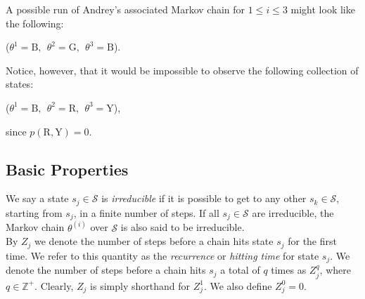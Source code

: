 \documentclass[12pt,twoside]{reedthesis}
\begin{document}
	A possible run of Andrey's associated Markov chain for $1 \leq i \leq 3$ might look like the following:
	\begin{center}
		($\theta^{1} = \textrm{B},\ \  \theta^{2} = \textrm{G},\ \ \theta^{3} = \textrm{B}$).
	\end{center}
	Notice, however, that it would be impossible to observe the following collection of states:
	\begin{center}
		($\theta^{1} = \textrm{B},\ \ \theta^{2} = \textrm{R},\ \  \theta^{3} = \textrm{Y}$),
	\end{center}
	since $p(\textrm{R}, \textrm{Y}) = 0$.

		\subsection*{Basic Properties}
		We say a state $s_j \in \mathcal{S}$ is {\em irreducible} if it is possible to get to any other $s_k \in \mathcal{S}$, starting from $s_j$, in a finite number of steps. If all $s_j \in \mathcal{S}$ are irreducible, the Markov chain $\theta^{(i)}$ over $\mathcal{S}$ is also said to be irreducible. \\
		
		By $Z_j$ we denote the number of steps before a chain hits state $s_j$ for the first time. 
		We refer to this quantity as the {\em recurrence} or {\em hitting time} for state $s_j$.
		We denote the number of steps before a chain hits $s_j$ a total of $q$ times as $Z^{q}_j$, where $q \in \mathbb Z^+$. Clearly, $Z_j$ is simply shorthand for $Z^{1}_j$. We also define $Z^{0}_j = 0$. \\
		
\end{document}
